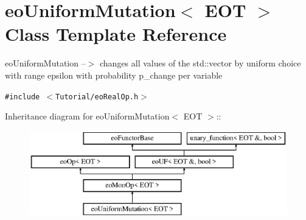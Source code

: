 \section{eo\-Uniform\-Mutation$<$ EOT $>$ Class Template Reference}
\label{classeo_uniform_mutation}
eo\-Uniform\-Mutation --$>$ changes all values of the std::vector by uniform choice with range epsilon with probability p\_\-change per variable  


{\tt \#include $<$Tutorial/eo\-Real\-Op.h$>$}

Inheritance diagram for eo\-Uniform\-Mutation$<$ EOT $>$::\begin{figure}[H]
\begin{center}
\leavevmode
\includegraphics[height=3.71476cm]{classeo_uniform_mutation}
\end{center}
\end{figure}
